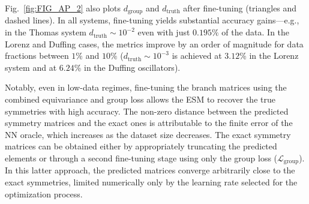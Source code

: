 Fig.~\ref{fig:FIG_AP_2} also plots $d_{\mathrm{group}}$ and $d_{\mathrm{truth}}$ after fine-tuning (triangles and dashed lines). In all systems, fine-tuning yields substantial accuracy gains—e.g., in the Thomas system $d_{\mathrm{truth}} \sim 10^{-2}$ even with just $0.195 \%$ of the data. In the Lorenz and Duffing cases, the metrics improve by an order of magnitude for data fractions between $1\%$ and $10\%$ ($d_{\mathrm{truth}} \sim 10^{-3}$ is achieved at $3.12 \%$ in the Lorenz system and at $6.24 \%$ in the Duffing oscillators).

Notably, even in low-data regimes, fine-tuning the branch matrices using the combined equivariance and group loss allows the ESM to recover the true symmetries with high accuracy. The non-zero distance between the predicted symmetry matrices and the exact ones is attributable to the finite error of the NN oracle, which increases as the dataset size decreases. The exact symmetry matrices can be obtained either by appropriately truncating the predicted elements or through a second fine-tuning stage using only the group loss ($\mathcal{L}_{\mathrm{group}}$). In this latter approach, the predicted matrices converge arbitrarily close to the exact symmetries, limited numerically only by the learning rate selected for the optimization process.



\clearpage
